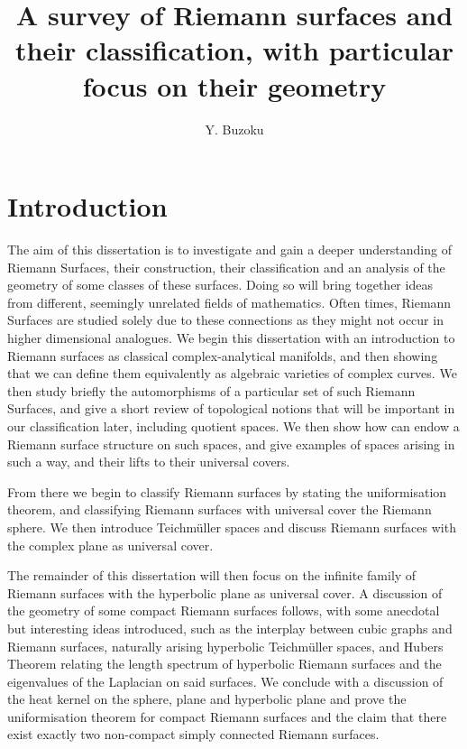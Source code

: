 \documentclass[a4paper,12pt]{report}
\title{A survey of Riemann surfaces and their classification, with particular focus on their geometry}
\author{Y. Buzoku}
\theoremstyle{plain}
\theoremstyle{definition}
\begin{document}
%
\chapter{Introduction}

The aim of this dissertation is to investigate and gain a deeper
understanding of
Riemann Surfaces, their construction, their classification and an analysis
of the
geometry of some classes of these surfaces. Doing so will bring together
ideas
from different, seemingly unrelated fields of mathematics. Often times,
Riemann
Surfaces are studied solely due to these connections as they might not
occur in
higher dimensional analogues. We begin this dissertation with an
introduction to
Riemann surfaces as classical complex-analytical manifolds, and then
showing that
we can define them equivalently as algebraic varieties of complex curves.
We then 
study briefly the automorphisms of a particular set of such Riemann
Surfaces, and 
give a short review of topological notions that will be important in our 
classification later, including quotient spaces. We then show how can
endow a 
Riemann surface structure on such spaces, and give examples of spaces
arising in such a way, and their lifts to their universal covers.

From there we begin to classify Riemann surfaces by stating the
uniformisation 
theorem, and classifying Riemann surfaces with universal cover the Riemann
sphere. We then introduce Teichm\"{u}ller spaces and discuss Riemann
surfaces with the complex plane as universal cover.

The remainder of this dissertation will then focus on the infinite family
of Riemann surfaces with the hyperbolic plane as universal cover. A
discussion of the geometry of some compact Riemann surfaces follows, with
some anecdotal but interesting ideas introduced, such as the interplay
between cubic graphs and Riemann surfaces, naturally arising hyperbolic
Teichm\"{u}ller spaces, and Hubers Theorem relating the length spectrum of
hyperbolic Riemann surfaces and the eigenvalues of the Laplacian on said
surfaces. We conclude with a discussion of the heat kernel on the sphere,
plane and hyperbolic plane and prove the uniformisation theorem for
compact Riemann surfaces and the claim that there exist exactly two
non-compact simply connected Riemann surfaces.
\end{document}
